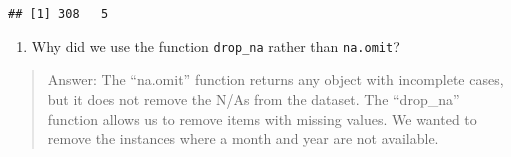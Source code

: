 \documentclass[]{article}
\providecommand{\tightlist}{%
  \setlength{\itemsep}{0pt}\setlength{\parskip}{0pt}}
\begin{document}
\begin{verbatim}
## [1] 308   5
\end{verbatim}

\begin{enumerate}
\def\labelenumi{\arabic{enumi}.}
\setcounter{enumi}{13}
\tightlist
\item
  Why did we use the function \texttt{drop\_na} rather than
  \texttt{na.omit}?
\end{enumerate}

\begin{quote}
Answer: The ``na.omit'' function returns any object with incomplete
cases, but it does not remove the N/As from the dataset. The
``drop\_na'' function allows us to remove items with missing values. We
wanted to remove the instances where a month and year are not available.
\end{quote}
\end{document}
